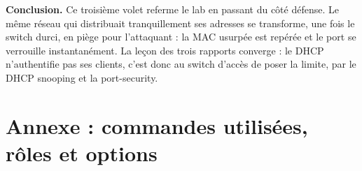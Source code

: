 \documentclass[11pt,a4paper]{article}
\begin{document}
\medskip
\noindent\textbf{Conclusion.} Ce troisième volet referme le lab en passant du côté défense. Le
même réseau qui distribuait tranquillement ses adresses se transforme, une fois le switch
durci, en piège pour l'attaquant : la MAC usurpée est repérée et le port se verrouille
instantanément. La leçon des trois rapports converge : le DHCP n'authentifie pas ses clients,
c'est donc au switch d'accès de poser la limite, par le DHCP snooping et la port-security.

\signatureHamady

\section{Annexe : commandes utilisées, rôles et options}
\end{document}
